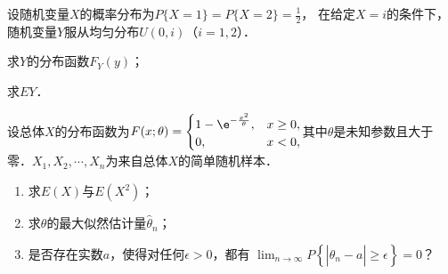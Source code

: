 \documentclass[plain,noanswer,medmath]{../../template/jnuexam}
\begin{document}
\begin{problem}[points=11]
设随机变量$X$的概率分布为$P\{X = 1\} = P\{X = 2\} = \frac{1}{2}$，
在给定$X = i$的条件下，随机变量$Y$服从均匀分布$U(0,i)$（$i = 1,2$）．\par
\begin{enumerate*}
\item 求$Y$的分布函数$F_Y(y)$；
\item 求$EY$．
\end{enumerate*}
\end{problem}


\begin{problem}[points=11]
设总体$X$的分布函数为$F(x;\theta) = \begin{cases}
  1 - \e^{- \frac{x^2}{\theta}}, & x \ge 0, \\
                              0, & x < 0,
\end{cases}$其中$\theta$是未知参数且大于零．$X_1,X_2,\cdots,X_n$为来自总体$X$的简单随机样本．
\begin{enumerate}
\item 求$E(X)$与$E(X^2)$；
\item 求$\theta$的最大似然估计量$\hat{\theta}_n$；
\item 是否存在实数$a$，使得对任何$\epsilon > 0$，都有
      $\lim_{n \to \infty} P\left\{\left|\hat{\theta}_n - a\right| \ge \epsilon\right\} = 0$？
\end{enumerate}
\end{problem}
\end{document}
